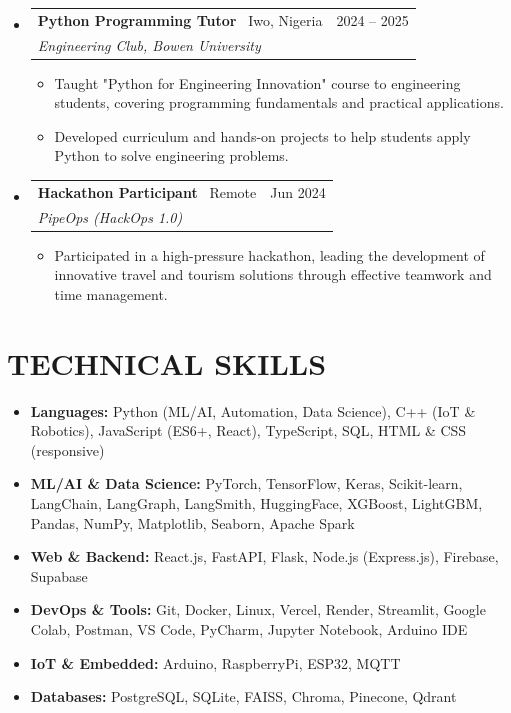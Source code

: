 \documentclass[11pt,a4paper]{article}
\makeatletter
\newcommand{\resumeSubheading}[5]{
  \vspace{2pt}
  \item[]
    \begin{tabular*}{\textwidth}[t]{l@{\extracolsep{\fill}}r}
      \textbf{#1} \textnormal{ \textbar\ #4} & #2 \\ %
      \textit{#3} & \\ %
    \end{tabular*}
    #5
  \vspace{-8pt}
}
\makeatother
\begin{document}
\begin{itemize}[leftmargin=0pt, label={}]

\resumeSubheading
  {Python Programming Tutor}{2024 -- 2025}
  {Engineering Club, Bowen University}{Iwo, Nigeria}
  {
  \begin{itemize}[leftmargin=15pt, label=\textbullet]
    \item Taught "Python for Engineering Innovation" course to engineering students, covering programming fundamentals and practical applications.
    \item Developed curriculum and hands-on projects to help students apply Python to solve engineering problems.
  \end{itemize}
  }

\resumeSubheading
  {Hackathon Participant}{Jun 2024}
  {PipeOps (HackOps 1.0)}{Remote}
  {
  \begin{itemize}[leftmargin=15pt, label=\textbullet]
    \item Participated in a high-pressure hackathon, leading the development of innovative travel and tourism solutions through effective teamwork and time management.
  \end{itemize}
  }

\end{itemize}

\section{TECHNICAL SKILLS}

\begin{itemize}[leftmargin=0pt, label={}]
\item \textbf{Languages:} Python (ML/AI, Automation, Data Science), C++ (IoT \& Robotics), JavaScript (ES6+, React), TypeScript, SQL, HTML \& CSS (responsive)

\item \textbf{ML/AI \& Data Science:} PyTorch, TensorFlow, Keras, Scikit-learn, LangChain, LangGraph, LangSmith, HuggingFace, XGBoost, LightGBM, Pandas, NumPy, Matplotlib, Seaborn, Apache Spark

\item \textbf{Web \& Backend:} React.js, FastAPI, Flask, Node.js (Express.js), Firebase, Supabase

\item \textbf{DevOps \& Tools:} Git, Docker, Linux, Vercel, Render, Streamlit, Google Colab, Postman, VS Code, PyCharm, Jupyter Notebook, Arduino IDE

\item \textbf{IoT \& Embedded:} Arduino, RaspberryPi, ESP32, MQTT

\item \textbf{Databases:} PostgreSQL, SQLite, FAISS, Chroma, Pinecone, Qdrant
\end{itemize}
\end{document}

